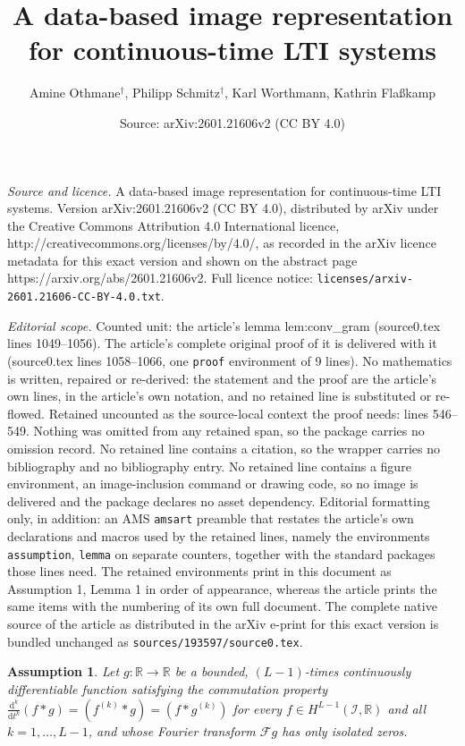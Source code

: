 \documentclass[10pt,a4paper]{amsart}
\title{A data-based image representation for continuous-time LTI systems}
\author{Amine Othmane${}^\dagger$, Philipp Schmitz${}^\dagger$, Karl Worthmann, Kathrin Flaßkamp}
\date{Source: arXiv:2601.21606v2 (CC BY 4.0)}
\newtheorem{assumption}{Assumption}
\newcommand{\R}{\mathbb R}
\newcommand{\intv}{\mathcal I}
\begin{document}
\maketitle

\noindent\emph{Source and licence.} A data-based image representation for continuous-time LTI systems. Version arXiv:2601.21606v2 (CC BY 4.0), distributed by arXiv under the Creative Commons Attribution 4.0 International licence, http://creativecommons.org/licenses/by/4.0/, as recorded in the arXiv licence metadata for this exact version and shown on the abstract page https://arxiv.org/abs/2601.21606v2. Full licence notice: \texttt{licenses/arxiv-2601.21606-CC-BY-4.0.txt}.\par\smallskip

\noindent\textit{Editorial scope.} Counted unit: the article's lemma lem:conv\_gram (source0.tex lines 1049--1056). The article's complete original proof of it is delivered with it (source0.tex lines 1058--1066, one \texttt{proof} environment of 9 lines). No mathematics is written, repaired or re-derived: the statement and the proof are the article's own lines, in the article's own notation, and no retained line is substituted or re-flowed.  Retained uncounted as the source-local context the proof needs: lines 546--549.  Nothing was omitted from any retained span, so the package carries no omission record.  No retained line contains a citation, so the wrapper carries no bibliography and no bibliography entry.  No retained line contains a figure environment, an image-inclusion command or drawing code, so no image is delivered and the package declares no asset dependency.  Editorial formatting only, in addition: an AMS \texttt{amsart} preamble that restates the article's own declarations and macros used by the retained lines, namely the environments \texttt{assumption}, \texttt{lemma} on separate counters, together with the standard packages those lines need.  The retained environments print in this document as Assumption 1, Lemma 1 in order of appearance, whereas the article prints the same items with the numbering of its own full document.  The complete native source of the article as distributed in the arXiv e-print for this exact version is bundled unchanged as \texttt{sources/193597/source0.tex}.
\begin{assumption}
\label{as:1}
    Let $g:\R\rightarrow\R$ be a bounded, $(L-1)$-times continuously differentiable function satisfying the commutation property  $\tfrac{\mathrm d^k}{\mathrm dt^k}(f*g) = (f^{(k)}*g) = (f*g^{(k)})$ for every $f\in H^{L-1}(\intv, \R)$ and all $k=1,\dots,L-1$, and whose Fourier transform $\mathcal Fg$ has only isolated zeros.
\end{assumption}
\end{document}
